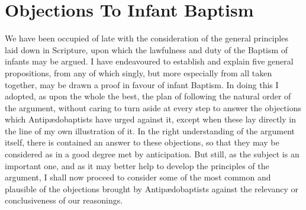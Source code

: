 \documentclass[]{book}
\begin{document}
\hypertarget{objections-to-infant-baptism}{%
\section{Objections To Infant Baptism}\label{objections-to-infant-baptism}}

We have been occupied of late with the consideration of the general principles laid down in Scripture, upon which the lawfulness and duty of the Baptism of infants may be argued. I have endeavoured to establish and explain five general propositions, from any of which singly, but more especially from all taken together, may be drawn a proof in favour of infant Baptism. In doing this I adopted, as upon the whole the best, the plan of following the natural order of the argument, without caring to turn aside at every step to answer the objections which Antipædobaptists have urged against it, except when these lay directly in the line of my own illustration of it. In the right understanding of the argument itself, there is contained an answer to these objections, so that they may be considered as in a good degree met by anticipation. But still, as the subject is an important one, and as it may better help to develop the principles of the argument, I shall now proceed to consider some of the most common and plausible of the objections brought by Antipædobaptists against the relevancy or conclusiveness of our reasonings.
\end{document}
